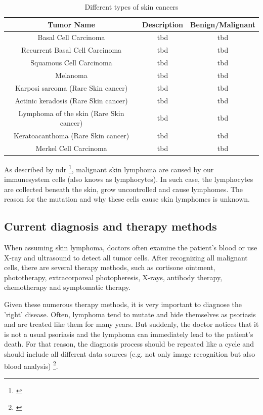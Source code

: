 \begin{table}[h!]
\begin{center}
 \begin{tabular}{|| c | c | c ||} 
 \hline
Tumor Name & Description & Benign/Malignant \\ [0.5ex] 
\hline\hline
Basal Cell Carcinoma & tbd & tbd \\
\hline
Recurrent Basal Cell Carcinoma & tbd & tbd \\
 \hline
 Squamous Cell Carcinoma & tbd & tbd \\
 \hline
Melanoma & tbd & tbd \\
 \hline
 Karposi sarcoma (Rare Skin cancer) & tbd & tbd \\
 \hline
  Actinic keradosis (Rare Skin cancer) & tbd & tbd \\
\hline
Lymphoma of the skin (Rare Skin cancer) & tbd & tbd \\
\hline
 Keratoacanthoma (Rare Skin cancer) & tbd & tbd \\
\hline
 Merkel Cell Carcinoma & tbd & tbd \\
 \hline
\end{tabular}
\caption{Different types of skin cancers} \label{table}         

\end{center}
\end{table}




As described by \ac{ndr} \footnote{\cite{ndr_lymphom}}, malignant skin lymphoma are caused by our immunesystem cells (also knows as lymphocytes). In such case, the lymphocytes are collected beneath the skin, grow uncontrolled and cause lymphomes. The reason for the mutation and why these cells cause skin lymphomes is unknown.

\subsection{Current diagnosis and therapy methods}

When assuming skin lymphoma, doctors often examine the patient's blood or use X-ray and ultrasound to detect all tumor cells. 
After recognizing all malignant cells, there are several therapy methods, such as cortisone ointment, phototherapy, extracorporeal photopheresis, X-rays, antibody therapy, chemotherapy and symptomatic therapy.

Given these numerous therapy methods, it is very important to diagnose the 'right' disease. Often, lymphoma tend to mutate and hide themselves as psoriasis and are treated like them for many years. But suddenly, the doctor notices that it is not a usual psoriasis and the lymphoma can immediately lead to the patient's death. For that reason, the diagnosis process should be repeated like a cycle and should include all different data sources (e.g. not only image recognition but also blood analysis) \footnote{\cite{ndr_lymphom}}. 

